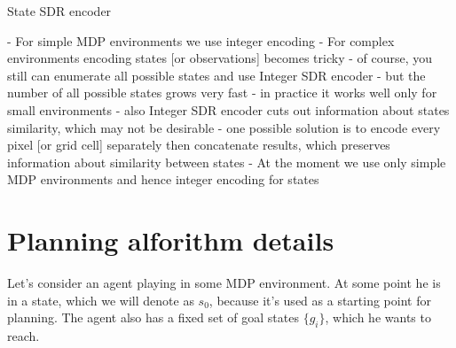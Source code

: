 \documentclass[a4paper]{article}
\begin{document}

State SDR encoder

- For simple MDP environments we use integer encoding
- For complex environments encoding states [or observations] becomes tricky
  - of course, you still can enumerate all possible states and use Integer SDR encoder
  - but the number of all possible states grows very fast
    - in practice it works well only for small environments
  - also Integer SDR encoder cuts out information about states similarity, which may not be desirable
  - one possible solution is to encode every pixel [or grid cell] separately then concatenate results, which preserves information about similarity between states
- At the moment we use only simple MDP environments and hence integer encoding for states

\section{Planning alforithm details}

Let's consider an agent playing in some MDP environment. At some point he is in a state, which we will denote as $s_0$, because it's used as a starting point for planning.  
The agent also has a fixed set of goal states $\{g_i\}$, which he wants to reach.
\end{document}
